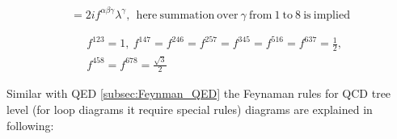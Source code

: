 \begin{equation}
[\lambda^{\alpha},\lambda^{\beta}]=2if^{\alpha\beta\gamma}\lambda^{\gamma},~~\mathrm{here~summation~over}~\gamma~\mathrm{from~1~to~8~is~implied}
\label{eq:comu_lambda}
\end{equation}

\begin{equation}
\begin{split}
&f^{123}=1,~f^{147}=f^{246}=f^{257}=f^{345}=f^{516}=f^{637}=\frac{1}{2},\\
&f^{458}=f^{678}=\frac{\sqrt{3}}{2}
\end{split}
\label{eq:structure_constant}
\end{equation}


Similar with QED \ref{subsec:Feynman_QED} the Feynaman rules for QCD tree level (for loop diagrams it require special rules) diagrams are explained in following:

